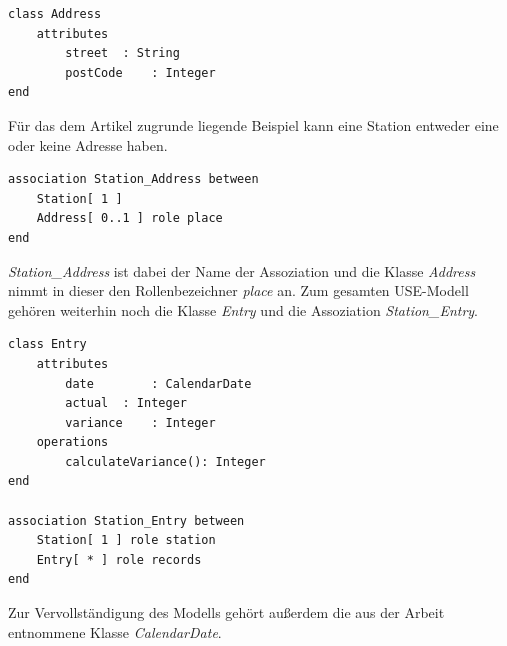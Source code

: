 \documentclass[a4paper,twoside]{article}
\begin{document}
\begin{lstlisting}[caption={USE-Spezifikation der Klasse Adresse},label=lst:use2]
class Address
	attributes
		street	: String
		postCode	: Integer
end
\end{lstlisting}

Für das dem Artikel zugrunde liegende Beispiel kann eine Station entweder eine oder keine Adresse haben.

\begin{lstlisting}[caption={USE-Spezifikation der Assoziation zwischen einer Station und einer Adresse},label=lst:assocs1]
association Station_Address between
	Station[ 1 ] 
	Address[ 0..1 ] role place
end
\end{lstlisting}

\textit{Station\_Address} ist dabei der Name der Assoziation und die Klasse \textit{Address} nimmt in dieser den Rollenbezeichner \textit{place} an. Zum gesamten USE-Modell gehören weiterhin noch die Klasse \textit{Entry} und die Assoziation \textit{Station\_Entry}.

\begin{lstlisting}[caption={USE-Spezifikation der Klasse Entry und der Assoziation zwischen einer Station und deren Entries},label=lst:assocs2]
class Entry
	attributes
		date		: CalendarDate
		actual	: Integer
		variance	: Integer
	operations
		calculateVariance(): Integer 
end

association Station_Entry between
	Station[ 1 ] role station
	Entry[ * ] role records
end
\end{lstlisting}

Zur Vervollständigung des Modells gehört außerdem die aus der Arbeit \cite{SilvaMasterThesis} entnommene Klasse \textit{CalendarDate}.
\end{document}
